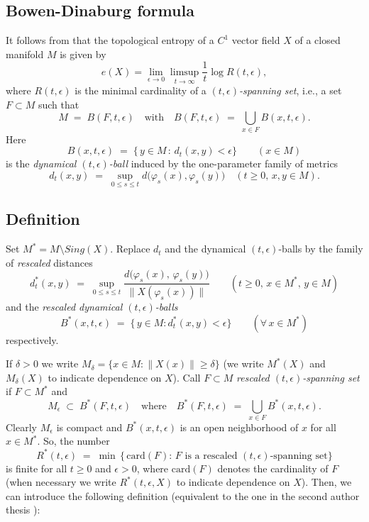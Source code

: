 \documentclass{amsart}
\numberwithin{equation}{section}
\begin{document}
\subsection{Bowen-Dinaburg formula}
It follows from \cite{b,d} that the topological entropy of a $C^1$ vector field $X$ of a closed manifold $M$ is given by
\begin{equation}
\label{bolso}
e(X)=\lim_{\epsilon \to 0} \limsup_{t \to \infty} \frac{1}{t}\log R(t,\epsilon),
\end{equation}
where \(R(t,\epsilon)\) is the minimal cardinality of a \emph{\((t,\epsilon)\)-spanning set}, i.e., a set \(F \subset M\) such that
\[
M \;=\; B(F,t,\epsilon)
\quad\text{with}\quad
B(F,t,\epsilon)\;=\;\bigcup_{x \in F} B(x,t,\epsilon).
\]
Here
\begin{equation}
\label{kubrick}
B(x,t,\epsilon)
\;=\;
\{\,y \in M \,:\, d_t(x,y) < \epsilon \}
\quad\quad(x \in M)
\end{equation}
is the {\em dynamical \((t,\epsilon)\)-ball}
induced by the one-parameter family of metrics
\[
d_t(x,y)\;=\;\sup_{0 \le s \le t} d\bigl(\varphi_s(x), \varphi_s(y)\bigr)
\quad(t \ge 0,\, x,y\in M).
\]

\subsection{Definition}
Set $M^*=M\setminus Sing(X)$. Replace \(d_t\) and the dynamical $(t,\epsilon)$-balls by the family of \emph{rescaled} distances
\[
d^*_t(x,y)
\;=\;
\sup_{0 \le s \le t} \frac{d\bigl(\varphi_s(x),\,\varphi_s(y)\bigr)}{\|X(\varphi_s(x))\|}
\quad\quad (t \ge 0,\, x\in M^*,\, y\in M)
\]
and the \emph{rescaled dynamical \((t,\epsilon)\)-balls}
\[
B^*(x,t,\epsilon)
\;=\;
\{\,y \in M : d^*_t(x,y) < \epsilon\}
\quad\quad(\forall\, x \in M^*)
\]
respectively.

If $\delta>0$ we write $M_\delta=\{x\in M:\|X(x)\|\geq\delta\}$
(we write $M^*(X)$ and
$M_\delta(X)$ to indicate dependence on $X$).
Call \(F \subset M\) \emph{rescaled \((t,\epsilon)\)-spanning set} if \(F \subset M^*\) and
\[
M_\epsilon \;\subset\; B^*(F,t,\epsilon)
\quad\text{where}\quad
B^*(F,t,\epsilon)\;=\;\bigcup_{x \in F} B^*(x,t,\epsilon).
\]
Clearly \(M_\epsilon\) is compact and \(B^*(x,t,\epsilon)\) is an open neighborhood of \(x\) for all \(x \in M^*\). So, the number
\[
R^*(t,\epsilon)
\;=\;
\min \,\bigl\{\,
\mathrm{card}(F)
:\,F \text{ is a rescaled \((t,\epsilon)\)-spanning set}
\bigr\}
\]
is finite for all \(t \ge 0\) and \(\epsilon > 0\), where \(\mathrm{card}(F)\) denotes the cardinality of \(F\) (when necessary we write
$R^*(t,\epsilon,X)$ to indicate dependence on $X$).
Then, we can introduce the following definition (equivalent to the one in the second author thesis \cite{r}):
\end{document}
